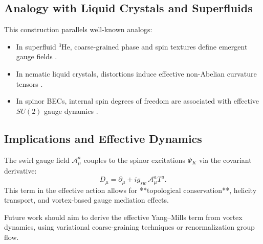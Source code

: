 \documentclass[12pt]{article}
\begin{document}
    \subsection*{Analogy with Liquid Crystals and Superfluids}

    This construction parallels well-known analogs:
    \begin{itemize}
        \item In superfluid \( ^3\mathrm{He} \), coarse-grained phase and spin textures define emergent gauge fields \cite{Volovik2009}.
        \item In nematic liquid crystals, distortions induce effective non-Abelian curvature tensors \cite{Lubensky2002}.
        \item In spinor BECs, internal spin degrees of freedom are associated with effective \( SU(2) \) gauge dynamics \cite{Ho1998}.
    \end{itemize}

    \subsection*{Implications and Effective Dynamics}

    The swirl gauge field \( \mathcal{A}_\mu^a \) couples to the spinor excitations \( \Psi_K \) via the covariant derivative:
    \[
        D_\mu = \partial_\mu + i g_{sw}\, \mathcal{A}_\mu^a T^a.
    \]
    This term in the effective action allows for **topological conservation**, helicity transport, and vortex-based gauge mediation effects.

    Future work should aim to derive the effective Yang–Mills term from vortex dynamics, using variational coarse-graining techniques or renormalization group flow.
\end{document}
